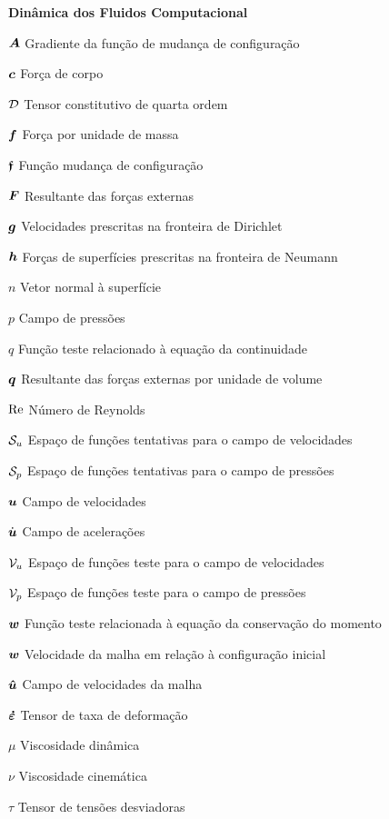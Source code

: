 \begin{simbolos}
    \item[\textbf{Dinâmica dos Fluidos Computacional}]
    \item[$\boldsymbol{A}$] Gradiente da função de mudança de configuração
    \item[$\boldsymbol{c}$] Força de corpo
    \item[$\mathcal{D}$] Tensor constitutivo de quarta ordem
    \item[$\boldsymbol{f}$] Força por unidade de massa
    \item[$\boldsymbol{\mathfrak{f}}$] Função mudança de configuração
    \item[$\boldsymbol{F}$] Resultante das forças externas
    \item[$\boldsymbol{g}$] Velocidades prescritas na fronteira de Dirichlet
    \item[$\boldsymbol{h}$] Forças de superfícies prescritas na fronteira de Neumann
    \item[$n$] Vetor normal à superfície
    \item[$p$] Campo de pressões
    \item[$q$] Função teste relacionado à equação da continuidade
    \item[$\boldsymbol{q}$] Resultante das forças externas por unidade de volume
    \item[$\mathrm{Re}$] Número de Reynolds
    \item[$\mathcal{S}_u$] Espaço de funções tentativas para o campo de velocidades
    \item[$\mathcal{S}_p$] Espaço de funções tentativas para o campo de pressões
    \item[$\boldsymbol{u}$] Campo de velocidades
    \item[$\dot{\boldsymbol{u}}$] Campo de acelerações
    \item[$\mathcal{V}_u$] Espaço de funções teste para o campo de velocidades
    \item[$\mathcal{V}_p$] Espaço de funções teste para o campo de pressões
    \item[$\boldsymbol{w}$] Função teste relacionada à equação da conservação do momento
    \item[$\boldsymbol{w}$] Velocidade da malha em relação à configuração inicial
    \item[$\boldsymbol{\hat{u}}$] Campo de velocidades da malha
    \item[$\boldsymbol{\dot{\varepsilon}}$] Tensor de taxa de deformação
    \item[$\mu$] Viscosidade dinâmica
    \item[$\nu$] Viscosidade cinemática
    \item[$\tau$] Tensor de tensões desviadoras


\end{simbolos}
